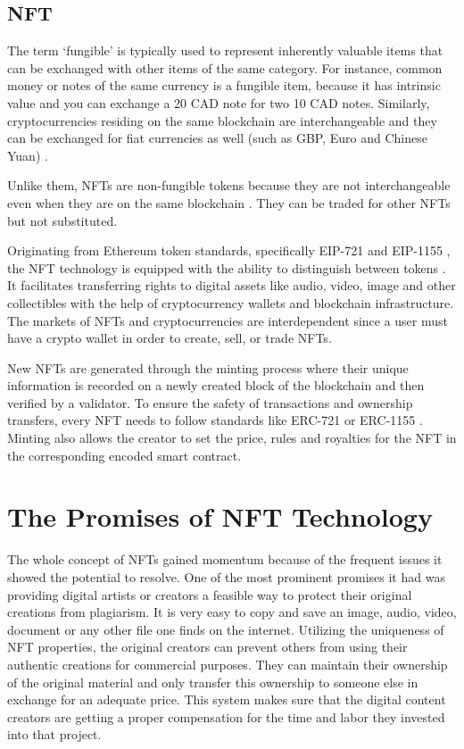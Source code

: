 \documentclass[12pt]{article}
\begin{document}
\subsection{NFT}
{\color{blue} The term ‘fungible’ is typically used to represent inherently valuable items that can be exchanged with other items of the same category. For instance, common money or notes of the same currency is a fungible item, because it has intrinsic value and you can exchange a 20 CAD note for two 10 CAD notes. Similarly, cryptocurrencies residing on the same blockchain are interchangeable and they can be exchanged for fiat currencies as well (such as GBP, Euro and Chinese Yuan) \cite{UMAR2021121025}.


Unlike them, NFTs are non-fungible tokens because they are not interchangeable even when they are on the same blockchain \cite{Investopedia}. They can be traded for other NFTs but not substituted.}

Originating from Ethereum token standards, specifically EIP-721 \cite{cabot2022improving} and EIP-1155 \cite{chen2022toward}, the NFT technology is equipped with the ability to distinguish between tokens \cite{wang2021non}. It facilitates transferring rights to digital assets like audio, video, image and other collectibles with the help of cryptocurrency wallets and blockchain infrastructure. The markets of NFTs and cryptocurrencies are interdependent \cite{ante2022non} since a user must have a crypto wallet in order to create, sell, or trade NFTs.

{\color{blue} New NFTs are generated through the minting process where their unique information is recorded on a newly created block of the blockchain and then verified by a validator. To ensure the safety of transactions and ownership transfers, every NFT needs to follow standards like ERC-721 or ERC-1155 \cite{9803425}. Minting also allows the creator to set the price, rules and royalties for the NFT \cite{10.1145/3474355} in the corresponding encoded smart contract.}

\section{The Promises of NFT Technology}
The whole concept of NFTs gained momentum because of the frequent issues it showed the potential to resolve. One of the most prominent promises it had was providing digital artists or creators a feasible way to protect their original creations from plagiarism. It is very easy to copy and save an image, audio, video, document or any other file one finds on the internet. Utilizing the uniqueness of NFT properties, the original creators can prevent others from using their authentic creations for commercial purposes. They can maintain their ownership of the original material and only transfer this ownership to someone else in exchange for an adequate price. This system makes sure that the digital content creators are getting a proper compensation for the time and labor they invested into that project.
\end{document}
